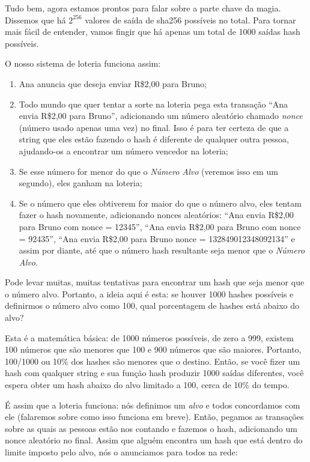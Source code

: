 Tudo bem, agora estamos prontos para falar sobre a parte chave da magia. Dissemos que há \(2^{256}\) valores de saída de sha256 possíveis no total. Para tornar mais fácil de entender, vamos fingir que há apenas um total de 1000 saídas hash possíveis.

O nosso sistema de loteria funciona assim:

\begin{enumerate}
\item Ana anuncia que deseja enviar R\$2,00 para Bruno;
\item Todo mundo que quer tentar a sorte na loteria pega esta transação “Ana envia R\$2,00 para Bruno”, adicionando um número aleatório chamado \textit{nonce} (número usado apenas uma vez) no final. Isso é para ter certeza de que a string que eles estão fazendo o hash é diferente de qualquer outra pessoa, ajudando-os a encontrar um número vencedor na loteria;
\item Se esse número for menor do que o \textit{Número Alvo} (veremos isso em um segundo), eles ganham na loteria;
\item Se o número que eles obtiverem for maior do que o número alvo, eles tentam fazer o hash novamente, adicionando nonces aleatórios: “Ana envia R\$2,00 para Bruno com nonce = 12345”, “Ana envia R\$2,00 para Bruno com nonce = 92435”, “Ana envia R\$2,00 para Bruno nonce = 132849012348092134” e assim por diante, até que o número hash resultante seja menor que o \textit{Número Alvo}.
\end{enumerate}

Pode levar muitas, muitas tentativas para encontrar um hash que seja menor que o número alvo. Portanto, a ideia aqui é esta: se houver 1000 hashes possíveis e definirmos o número alvo como 100, qual porcentagem de hashes está abaixo do alvo?

Esta é a matemática básica: de 1000 números possíveis, de zero a 999, existem 100 números que são menores que 100 e 900 números que são maiores. Portanto, 100/1000 ou 10\% dos hashes são menores que o destino. Então, se você fizer um hash com qualquer string e sua função hash produzir 1000 saídas diferentes, você espera obter um hash abaixo do alvo limitado a 100, cerca de 10\% do tempo.

É assim que a loteria funciona: nós definimos um \textit{alvo} e todos concordamos com ele (falaremos sobre como isso funciona em breve). Então, pegamos as transações sobre as quais as pessoas estão nos contando e fazemos o hash, adicionando um nonce aleatório no final. Assim que alguém encontra um hash que está dentro do limite imposto pelo alvo, nós o anunciamos para todos na rede:

